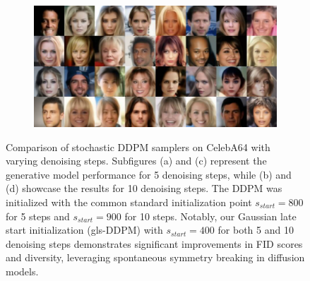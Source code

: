 \documentclass{article}
\begin{document}
\begin{figure}
\begin{subfigure}{0.495\textwidth}
    \includegraphics[width=\linewidth]{figs/imgs/ddpm_ddpm_celeba64_data_samples_T_400_10_steps_ga_32_rec.jpg}
    \label{subfig:glsddpm_celeba64}
  \end{subfigure}
  \caption{Comparison of stochastic DDPM samplers on CelebA64 with varying denoising steps. Subfigures (a) and (c) represent the generative model performance for 5 denoising steps, while (b) and (d) showcase the results for 10 denoising steps. The DDPM was initialized with the common standard initialization point $s_{start}=800$ for 5 steps and $s_{start}=900$ for 10 steps. Notably, our Gaussian late start initialization (gls-DDPM) with $s_{start}=400$ for both 5 and 10 denoising steps demonstrates significant improvements in FID scores and diversity, leveraging spontaneous symmetry breaking in diffusion models.}
  \label{fig:gls_ddpm_performance}
\end{figure}
\end{document}
